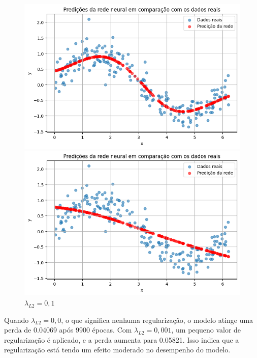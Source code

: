 \begin{figure}[htb]
\begin{minipage}{0.45\textwidth}
		\includegraphics[width=\textwidth]{./0803_imgs/0703_tarefa06/png-241111-193629109-11720175723589392501.png}
	\end{minipage}
	\hfill
	\begin{minipage}{0.45\textwidth}
		\centering
		\caption{$\lambda_{L2}=0,1$}\label{fig:tarefa06:01:predicoes}
		\includegraphics[width=\textwidth]{./0803_imgs/0703_tarefa06/png-241111-193757953-13380955252315067618.png}
	\end{minipage}
\end{figure}

 Quando $\lambda_{L2}=0,0$, o que significa nenhuma regularização, o modelo 
 atinge uma perda de 0.04069 após 9900 épocas. Com $\lambda_{L2}=0,001$, um 
 pequeno valor de regularização é aplicado, e a perda 
aumenta para 0.05821. Isso indica que a regularização está tendo um efeito 
moderado no 
desempenho do modelo.

